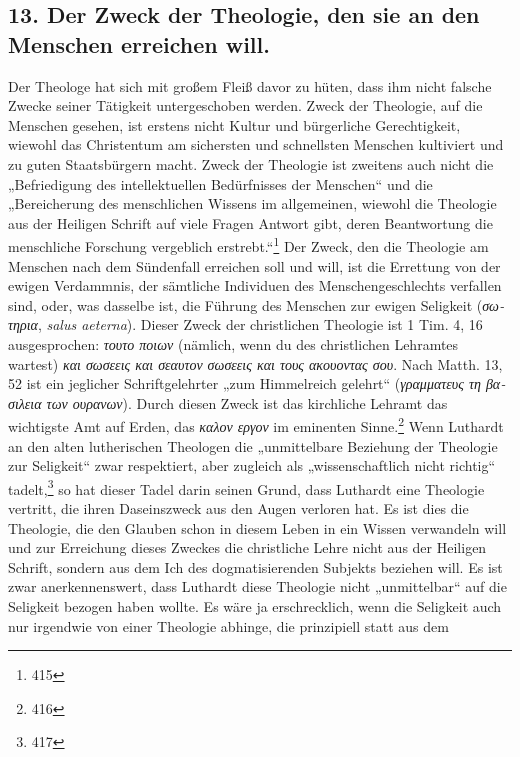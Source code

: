 \subsection*{13. Der Zweck der Theologie, den sie an den Menschen erreichen will.}

Der Theologe hat sich mit großem Fleiß davor zu hüten, dass ihm nicht falsche Zwecke seiner Tätigkeit untergeschoben werden. Zweck der Theologie, auf die Menschen gesehen, ist erstens nicht Kultur und bürgerliche Gerechtigkeit, wiewohl das Christentum am sichersten und schnellsten Menschen kultiviert und zu guten Staatsbürgern macht. Zweck der Theologie ist zweitens auch nicht die „Befriedigung des intellektuellen Bedürfnisses der Menschen“ und die „Bereicherung des menschlichen Wissens im allgemeinen, wiewohl die Theologie aus der Heiligen Schrift auf viele Fragen Antwort gibt, deren Beantwortung die menschliche Forschung vergeblich erstrebt.“\footnote{415} Der Zweck, den die Theologie am Menschen nach dem Sündenfall erreichen soll und will, ist die Errettung von der ewigen Verdammnis, der sämtliche Individuen des Menschengeschlechts verfallen sind, oder, was dasselbe ist, die Führung des Menschen zur ewigen Seligkeit (\textit{\textgreek{σωτηρια}}, \textit{salus aeterna}). Dieser Zweck der christlichen Theologie ist 1 Tim. 4, 16 ausgesprochen: \textit{\textgreek{τουτο ποιων}} (nämlich, wenn du des christlichen Lehramtes wartest) \textit{\textgreek{και σωσεεις και σεαυτον σωσεεις και τους ακουοντας σου}}. Nach Matth. 13, 52 ist ein jeglicher Schriftgelehrter „zum Himmelreich gelehrt“ (\textit{\textgreek{γραμματευς τη βασιλεια των ουρανων}}). Durch diesen Zweck ist das kirchliche Lehramt das wichtigste Amt auf Erden, das \textit{\textgreek{καλον εργον}} im eminenten Sinne.\footnote{416} Wenn Luthardt an den alten lutherischen Theologen die „unmittelbare Beziehung der Theologie zur Seligkeit“ zwar respektiert, aber zugleich als „wissenschaftlich nicht richtig“ tadelt,\footnote{417} so hat dieser Tadel darin seinen Grund, dass Luthardt eine Theologie vertritt, die ihren Daseinszweck aus den Augen verloren hat. Es ist dies die Theologie, die den Glauben schon in diesem Leben in ein Wissen verwandeln will und zur Erreichung dieses Zweckes die christliche Lehre nicht aus der Heiligen Schrift, sondern aus dem Ich des dogmatisierenden Subjekts beziehen will. Es ist zwar anerkennenswert, dass Luthardt diese Theologie nicht „unmittelbar“ auf die Seligkeit bezogen haben wollte. Es wäre ja erschrecklich, wenn die Seligkeit auch nur irgendwie von einer Theologie abhinge, die prinzipiell statt aus dem

